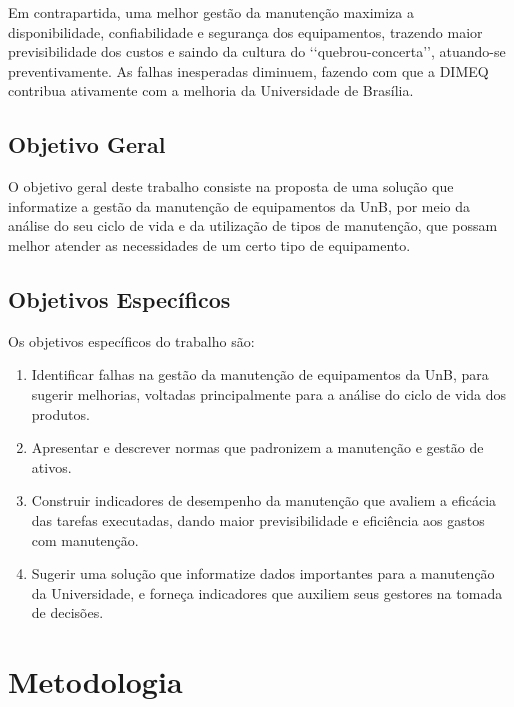 Em contrapartida, uma melhor gestão da manutenção maximiza a disponibilidade, confiabilidade e segurança dos equipamentos, trazendo maior previsibilidade dos custos e saindo da cultura do \lq\lq quebrou-concerta\rq\rq, atuando-se preventivamente. As falhas inesperadas diminuem, fazendo com que a DIMEQ contribua ativamente com a melhoria da Universidade de Brasília.



\section{Objetivo Geral}
 
O objetivo geral deste trabalho consiste na proposta de uma solução que informatize a gestão da manutenção de equipamentos da UnB, por meio da análise do seu ciclo de vida e da utilização de tipos de manutenção, que possam melhor atender as necessidades de um certo tipo de equipamento. 


\section{Objetivos Específicos}

Os objetivos específicos do trabalho são:

\begin{enumerate}
	\item Identificar falhas na gestão da manutenção de equipamentos da UnB, para sugerir melhorias, voltadas principalmente para a análise do ciclo de vida dos produtos.
	\item Apresentar e descrever normas que padronizem a manutenção e gestão de ativos.
	\item Construir indicadores de desempenho da manutenção que avaliem a eficácia das tarefas executadas, dando maior previsibilidade e eficiência aos gastos com manutenção.
	\item Sugerir uma solução que informatize dados importantes para a manutenção da Universidade, e forneça indicadores que auxiliem seus gestores na tomada de decisões.
	\end{enumerate}


\chapter{Metodologia}

